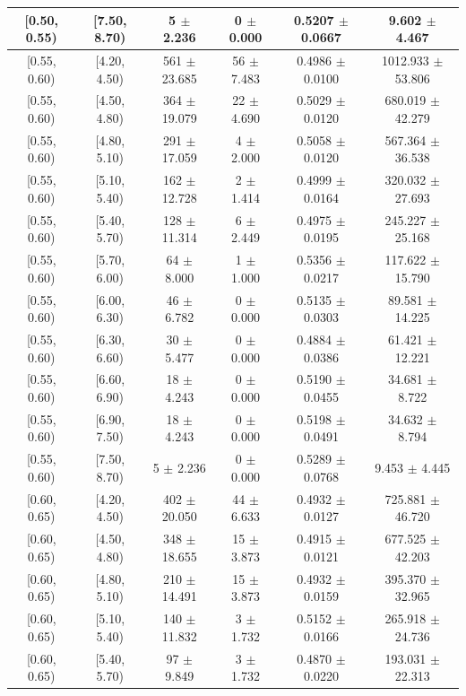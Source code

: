 \begin{longtable}{|c|c|c|c|c|c|}
\hline
[0.50, 0.55) & [7.50, 8.70) & 5 $\pm$ 2.236 & 0 $\pm$ 0.000 & 0.5207 $\pm$ 0.0667 & 9.602 $\pm$ 4.467 \\ 
\hline
[0.55, 0.60) & [4.20, 4.50) & 561 $\pm$ 23.685 & 56 $\pm$ 7.483 & 0.4986 $\pm$ 0.0100 & 1012.933 $\pm$ 53.806 \\ 
\hline
[0.55, 0.60) & [4.50, 4.80) & 364 $\pm$ 19.079 & 22 $\pm$ 4.690 & 0.5029 $\pm$ 0.0120 & 680.019 $\pm$ 42.279 \\ 
\hline
[0.55, 0.60) & [4.80, 5.10) & 291 $\pm$ 17.059 & 4 $\pm$ 2.000 & 0.5058 $\pm$ 0.0120 & 567.364 $\pm$ 36.538 \\ 
\hline
[0.55, 0.60) & [5.10, 5.40) & 162 $\pm$ 12.728 & 2 $\pm$ 1.414 & 0.4999 $\pm$ 0.0164 & 320.032 $\pm$ 27.693 \\ 
\hline
[0.55, 0.60) & [5.40, 5.70) & 128 $\pm$ 11.314 & 6 $\pm$ 2.449 & 0.4975 $\pm$ 0.0195 & 245.227 $\pm$ 25.168 \\ 
\hline
[0.55, 0.60) & [5.70, 6.00) & 64 $\pm$ 8.000 & 1 $\pm$ 1.000 & 0.5356 $\pm$ 0.0217 & 117.622 $\pm$ 15.790 \\ 
\hline
[0.55, 0.60) & [6.00, 6.30) & 46 $\pm$ 6.782 & 0 $\pm$ 0.000 & 0.5135 $\pm$ 0.0303 & 89.581 $\pm$ 14.225 \\ 
\hline
[0.55, 0.60) & [6.30, 6.60) & 30 $\pm$ 5.477 & 0 $\pm$ 0.000 & 0.4884 $\pm$ 0.0386 & 61.421 $\pm$ 12.221 \\ 
\hline
[0.55, 0.60) & [6.60, 6.90) & 18 $\pm$ 4.243 & 0 $\pm$ 0.000 & 0.5190 $\pm$ 0.0455 & 34.681 $\pm$ 8.722 \\ 
\hline
[0.55, 0.60) & [6.90, 7.50) & 18 $\pm$ 4.243 & 0 $\pm$ 0.000 & 0.5198 $\pm$ 0.0491 & 34.632 $\pm$ 8.794 \\ 
\hline
[0.55, 0.60) & [7.50, 8.70) & 5 $\pm$ 2.236 & 0 $\pm$ 0.000 & 0.5289 $\pm$ 0.0768 & 9.453 $\pm$ 4.445 \\ 
\hline
[0.60, 0.65) & [4.20, 4.50) & 402 $\pm$ 20.050 & 44 $\pm$ 6.633 & 0.4932 $\pm$ 0.0127 & 725.881 $\pm$ 46.720 \\ 
\hline
[0.60, 0.65) & [4.50, 4.80) & 348 $\pm$ 18.655 & 15 $\pm$ 3.873 & 0.4915 $\pm$ 0.0121 & 677.525 $\pm$ 42.203 \\ 
\hline
[0.60, 0.65) & [4.80, 5.10) & 210 $\pm$ 14.491 & 15 $\pm$ 3.873 & 0.4932 $\pm$ 0.0159 & 395.370 $\pm$ 32.965 \\ 
\hline
[0.60, 0.65) & [5.10, 5.40) & 140 $\pm$ 11.832 & 3 $\pm$ 1.732 & 0.5152 $\pm$ 0.0166 & 265.918 $\pm$ 24.736 \\ 
\hline
[0.60, 0.65) & [5.40, 5.70) & 97 $\pm$ 9.849 & 3 $\pm$ 1.732 & 0.4870 $\pm$ 0.0220 & 193.031 $\pm$ 22.313 \\ 

\end{longtable}
